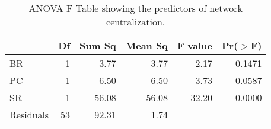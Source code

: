 \begin{table}[ht]
\centering
\begin{tabular}{lrrrrr}
  \hline
 & Df & Sum Sq & Mean Sq & F value & Pr($>$F) \\ 
  \hline
BR & 1 & 3.77 & 3.77 & 2.17 & 0.1471 \\ 
  PC & 1 & 6.50 & 6.50 & 3.73 & 0.0587 \\ 
  SR & 1 & 56.08 & 56.08 & 32.20 & 0.0000 \\ 
  Residuals & 53 & 92.31 & 1.74 &  &  \\ 
   \hline
\end{tabular}
\caption{ANOVA F Table showing the predictors of network centralization.} 
\label{tab:cen_aov}
\end{table}

